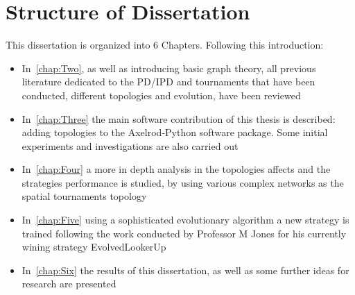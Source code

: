 \section{Structure of Dissertation}
This dissertation is organized into 6 Chapters. Following this introduction:
\begin{itemize}
  \item In~\autoref{chap:Two}, as well as introducing basic graph theory, all
        previous literature dedicated to the PD/IPD and tournaments that have
        been conducted, different topologies and evolution, have been reviewed
  \item In~\autoref{chap:Three} the main software contribution of this thesis is
        described: adding topologies to the Axelrod-Python software package.
        Some initial experiments and investigations are also carried out
  \item In~\autoref{chap:Four} a more in depth analysis in the topologies affects
				and the strategies performance is studied, by using various complex
				networks as the spatial tournaments topology
  \item In~\autoref{chap:Five} using a sophisticated evolutionary algorithm a
				new strategy is trained following the work conducted by Professor M Jones
				for his currently wining strategy EvolvedLookerUp
  \item In~\autoref{chap:Six} the results of this dissertation, as well as some
				further ideas for research are presented
\end{itemize}
